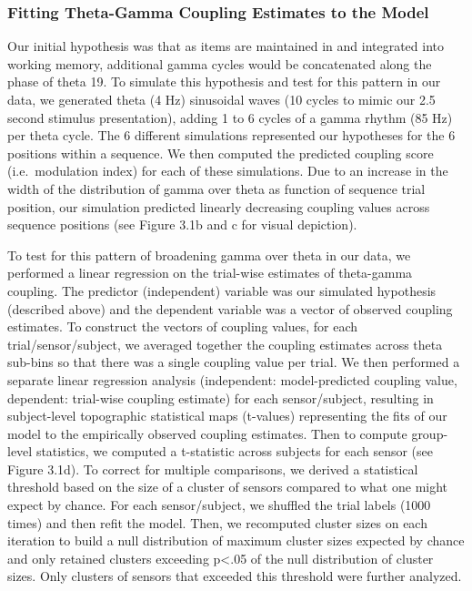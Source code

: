 \subsubsection{Fitting Theta-Gamma Coupling Estimates to the
Model}\label{fitting-theta-gamma-coupling-estimates-to-the-model}

Our initial hypothesis was that as items are maintained in and
integrated into working memory, additional gamma cycles would be
concatenated along the phase of theta 19. To simulate this hypothesis
and test for this pattern in our data, we generated theta (4 Hz)
sinusoidal waves (10 cycles to mimic our 2.5 second stimulus
presentation), adding 1 to 6 cycles of a gamma rhythm (85 Hz) per theta
cycle. The 6 different simulations represented our hypotheses for the 6
positions within a sequence. We then computed the predicted coupling
score (i.e.~modulation index) for each of these simulations. Due to an
increase in the width of the distribution of gamma over theta as
function of sequence trial position, our simulation predicted linearly
decreasing coupling values across sequence positions (see Figure 3.1b
and c for visual depiction).

To test for this pattern of broadening gamma over theta in our data, we
performed a linear regression on the trial-wise estimates of theta-gamma
coupling. The predictor (independent) variable was our simulated
hypothesis (described above) and the dependent variable was a vector of
observed coupling estimates. To construct the vectors of coupling
values, for each trial/sensor/subject, we averaged together the coupling
estimates across theta sub-bins so that there was a single coupling
value per trial. We then performed a separate linear regression analysis
(independent: model-predicted coupling value, dependent: trial-wise
coupling estimate) for each sensor/subject, resulting in subject-level
topographic statistical maps (t-values) representing the fits of our
model to the empirically observed coupling estimates. Then to compute
group-level statistics, we computed a t-statistic across subjects for
each sensor (see Figure 3.1d). To correct for multiple comparisons, we
derived a statistical threshold based on the size of a cluster of
sensors compared to what one might expect by chance. For each
sensor/subject, we shuffled the trial labels (1000 times) and then refit
the model. Then, we recomputed cluster sizes on each iteration to build
a null distribution of maximum cluster sizes expected by chance and only
retained clusters exceeding p\textless{}.05 of the null distribution of
cluster sizes. Only clusters of sensors that exceeded this threshold
were further analyzed.

